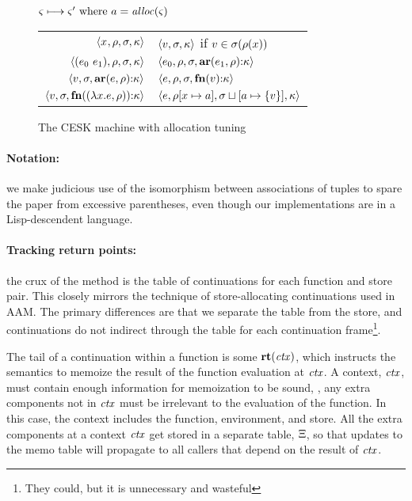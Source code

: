 \begin{figure}
  \centering
  $\varsigma \longmapsto \varsigma' \text{ where } a = \mathit{alloc}(\varsigma)$ \\
  \begin{tabular}{r|l}
    \hline
    $\langle x^{{}}, \rho, \sigma, \kappa \rangle$
    &
    $\langle v,\sigma,\kappa \rangle$ if $v \in \sigma(\rho(x))$
    \\
    $\langle (e_{0}\ e_{1}){}, \rho, \sigma, \kappa \rangle$
    &
    $\langle e_{0}, \rho, \sigma, \mathbf{ar}{}(e_{1},\rho){\tt :} \kappa \rangle$
    \\
    $\langle v, \sigma, \mathbf{ar}{}(e,\rho){\tt :} \kappa \rangle$
    &
    $\langle e, \rho, \sigma, \mathbf{fn}{}(v){\tt :} \kappa \rangle$
    \\
    $\langle v,\sigma,\mathbf{fn}{}((\lambda{} x. e, \rho)){\tt :} \kappa \rangle$
    &
    $\langle e, \rho[x \mapsto a], \sigma\sqcup[a \mapsto \{ v \}], \kappa \rangle$
  \end{tabular}
  \caption{The CESK machine with allocation tuning}
  \label{fig:base-semantics}
\end{figure}

\paragraph{Notation:} we make judicious use of the isomorphism between associations of tuples to spare the paper from excessive parentheses, even though our implementations are in a Lisp-descendent language.

\paragraph{Tracking return points:} the crux of the method is the table of continuations for each function and store pair.
%
This closely mirrors the technique of store-allocating continuations used in AAM.
%
The primary differences are that we separate the table from the store, and continuations do not indirect through the table for each continuation frame\footnote{They could, but it is unnecessary and wasteful}.

The tail of a continuation within a function is some $\mathbf{rt}(\mathit{ctx})$, which instructs the semantics to memoize the result of the function evaluation at $\mathit{ctx}$.
%
A context, $\mathit{ctx}$, must contain enough information for memoization to be sound, \ie, any extra components not in $\mathit{ctx}$ must be irrelevant to the evaluation of the function.
%
In this case, the context includes the function, environment, and store.
%
All the extra components at a context $\mathit{ctx}$ get stored in a separate table, $\Xi$, so that updates to the memo table will propagate to all callers that depend on the result of $\mathit{ctx}$.

